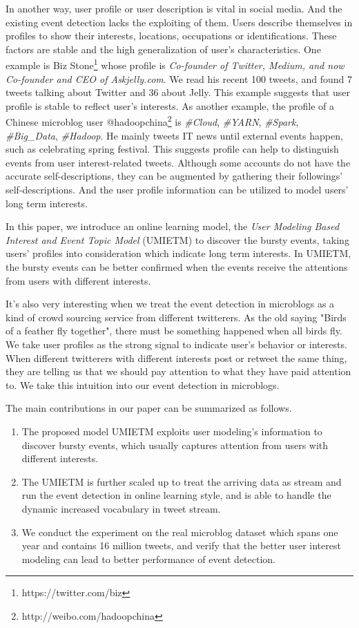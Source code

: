 \documentclass[runningheads,a4paper]{llncs}
\begin{document}
In another way, user profile or user description is vital in social media. 
And the existing event detection lacks the exploiting of them.
Users describe themselves in profiles to show their interests, locations, occupations or identifications.
These factors are stable and the high generalization of user's characteristics.
One example is Biz Stone\footnote{https://twitter.com/biz} whose profile is \textit{Co-founder of Twitter, Medium, and now Co-founder and CEO of Askjelly.com}. We read his recent 100 tweets, and found 7 tweets talking about Twitter and 36 about Jelly.
This example suggests that user profile is stable to reflect user's interests.
As another example, the profile of a Chinese microblog user @hadoopchina\footnote{http://weibo.com/hadoopchina} is \textit{\#Cloud}, \textit{\#YARN}, \textit{\#Spark}, \textit{\#Big\_Data}, \textit{\#Hadoop}. He mainly tweets IT news until external events happen, such as celebrating spring festival.
This suggests profile can help to distinguish events from user interest-related tweets.
Although some accounts do not have the accurate self-descriptions, they can be augmented by gathering their followings' self-descriptions.
And the user profile information can be utilized to model users' long term interests.

In this paper, we introduce an online learning model, the \textit{User Modeling Based Interest and Event Topic Model} (UMIETM) to discover the bursty events, taking users' profiles into consideration which indicate long term interests.
In UMIETM, the bursty events can be better confirmed when the events receive the attentions from users with different interests.

It's also very interesting when we treat the event detection in microblogs as a kind of crowd sourcing service from different twitterers.
As the old saying "Birds of a feather fly together", there must be something happened when all birds fly. 
We take user profiles as the strong signal to indicate user's behavior or interests.
When different twitterers with different interests post or retweet the same thing, they are telling us that we should pay attention to what they have paid attention to.
We take this intuition into our event detection in microblogs.

The main contributions in our paper can be summarized as follows.
\begin{enumerate}[topsep=0pt,itemsep=-1ex,partopsep=1ex,parsep=1ex]
\item The proposed model UMIETM exploits user modeling's information to discover bursty events, which usually captures attention from users with different interests.
\item The UMIETM is further scaled up to treat the arriving data as stream and run the event detection in online learning style, and is able to handle the dynamic increased vocabulary in tweet stream.
\item We conduct the experiment on the real microblog dataset which spans one year and contains 16 million tweets, and verify that the better user interest modeling can lead to  better performance of event detection.
\end{enumerate}
\end{document}
